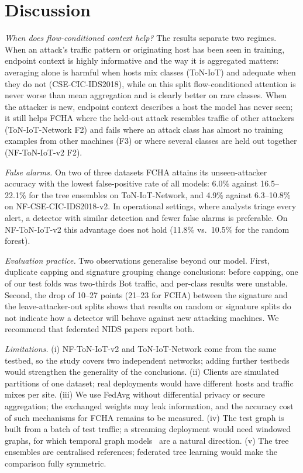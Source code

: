\documentclass[journal]{IEEEtran}
\begin{document}
\section{Discussion}
\label{sec:discussion}

\emph{When does flow-conditioned context help?} The results separate two regimes. When an attack's traffic pattern or originating host has been seen in training, endpoint context is highly informative and the way it is aggregated matters: averaging alone is harmful when hosts mix classes (ToN-IoT) and adequate when they do not (CSE-CIC-IDS2018), while on this split flow-conditioned attention is never worse than mean aggregation and is clearly better on rare classes. When the attacker is new, endpoint context describes a host the model has never seen; it still helps FCHA where the held-out attack resembles traffic of other attackers (ToN-IoT-Network F2) and fails where an attack class has almost no training examples from other machines (F3) or where several classes are held out together (NF-ToN-IoT-v2 F2).

\emph{False alarms.} On two of three datasets FCHA attains its unseen-attacker accuracy with the lowest false-positive rate of all models: 6.0\% against 16.5--22.1\% for the tree ensembles on ToN-IoT-Network, and 4.9\% against 6.3--10.8\% on NF-CSE-CIC-IDS2018-v2. In operational settings, where analysts triage every alert, a detector with similar detection and fewer false alarms is preferable. On NF-ToN-IoT-v2 this advantage does not hold (11.8\% vs.\ 10.5\% for the random forest).

\emph{Evaluation practice.} Two observations generalise beyond our model. First, duplicate capping and signature grouping change conclusions: before capping, one of our test folds was two-thirds Bot traffic, and per-class results were unstable. Second, the drop of 10--27 points (21--23 for FCHA) between the signature and the leave-attacker-out splits shows that results on random or signature splits do not indicate how a detector will behave against new attacking machines. We recommend that federated NIDS papers report both.

\emph{Limitations.} (i) NF-ToN-IoT-v2 and ToN-IoT-Network come from the same testbed, so the study covers two independent networks; adding further testbeds would strengthen the generality of the conclusions. (ii) Clients are simulated partitions of one dataset; real deployments would have different hosts and traffic mixes per site. (iii) We use FedAvg without differential privacy or secure aggregation; the exchanged weights may leak information, and the accuracy cost of such mechanisms for FCHA remains to be measured. (iv) The test graph is built from a batch of test traffic; a streaming deployment would need windowed graphs, for which temporal graph models~\cite{rossi2020tgn} are a natural direction. (v) The tree ensembles are centralised references; federated tree learning would make the comparison fully symmetric.
\end{document}
